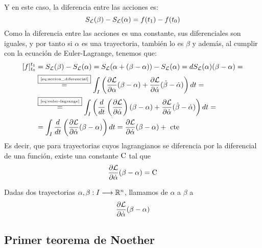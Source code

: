 Y en este caso, la diferencia entre las acciones es:
\begin{equation}
	\label{eq:variacion-accion-relacion}
	S_{\mathcal{L}}(\beta) - S_{\mathcal{L}}(\alpha) = f(t_1) - f(t_0)
\end{equation}
Como la diferencia entre las acciones es una constante, sus diferenciales son iguales, y por tanto si $\alpha$ es una trayectoria, también lo es $\beta$ y además, al cumplir con la ecuación de Euler-Lagrange, tenemos que:
\begin{equation}
	\label{eq:diferencial_trayectoria}
	\begin{split}
	[f]_{t_0}^{t_1} & = S_{\mathcal{L}}(\beta) - S_{\mathcal{L}}(\alpha) = S_{\mathcal{L}}(\alpha + (\beta-\alpha))-S_{\mathcal{L}}(\alpha)=dS_{\mathcal{L}}(\alpha)(\beta-\alpha)=\\
	&\overset{\fbox{\tiny \ref{eq:accion_diferencial}}}{=} \int_{I}\left( \frac{\partial \mathcal{L}}{\partial\alpha}(\beta-\alpha)+\frac{\partial \mathcal{L}}{\partial\dot{\alpha}}(\dot{\beta}-\dot{\alpha})\right) dt = \\
	&\overset{\fbox{\tiny \ref{eq:euler-lagrange}}}{=} \int_{I}\left( \frac{d}{dt}\left(\frac{\partial \mathcal{L}}{\partial\dot{\alpha}}\right)(\beta-\alpha)+\frac{\partial \mathcal{L}}{\partial\dot{\alpha}}(\dot{\beta}-\dot{\alpha})\right) dt=\\
	&= \int_{I}\frac{d}{dt}\left(\frac{\partial \mathcal{L}}{\partial\dot{\alpha}}(\beta-\alpha)\right) dt = \frac{\partial \mathcal{L}}{\partial\dot{\alpha}}(\beta-\alpha) + \text{ cte }
	\end{split}
\end{equation}
Es decir, que para trayectorias cuyos lagrangianos se diferencia por la diferencial de una función, existe una constante $\text{\rmfamily\upshape C}$ tal que
\begin{equation}
	\label{eq:carga_noether_para_trayectorias}
	\frac{\partial \mathcal{L}}{\partial\dot{\alpha}}(\beta-\alpha) = \text{\rmfamily\upshape C}
\end{equation}

\begin{definition}
	Dadas dos trayectorias $\alpha,\beta:I\longrightarrow \mathbb{R}^n$, llamamos  de $\alpha$ a $\beta$ a
	\begin{equation}
		\label{eq:carga_noether}
		\frac{\partial \mathcal{L}}{\partial\dot{\alpha}}(\beta-\alpha)
	\end{equation}
\end{definition}

\subsection{Primer teorema de Noether}\label{sec:primer-teorema-de-noether}

